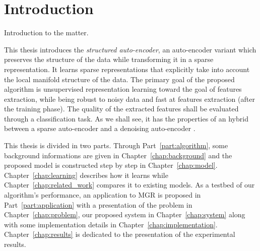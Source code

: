 \documentclass[a4paper,12pt,twoside]{report}
\newcommand{\partref}[1]{Part~\ref{part:#1}}
\newcommand{\chapref}[1]{Chapter~\ref{chap:#1}}
\begin{document}
\printglossaries




\chapter*{Introduction}

{\color{red} Introduction to the matter.}


This thesis introduces the \textit{structured auto-encoder}, an auto-encoder variant which preserves the structure of the data while transforming it in a sparse representation. It learns sparse representations that explicitly take into account the local manifold structure of the data.
The primary goal of the proposed algorithm is unsupervised representation learning toward the goal of features extraction, while being robust to noisy data and fast at features extraction (after the training phase). The quality of the extracted features shall be evaluated through a classification task.
As we shall see, it has the properties of an hybrid between a sparse auto-encoder \cite{lecun2006sparseAutoencoders, ranzato2007stackedSparseAutoencoders} and a denoising auto-encoder \cite{bengio2008denoisingAutoencoders}.

This thesis is divided in two parts. Through \partref{algorithm},
some background informations are given in \chapref{background} and the proposed model is
constructed step by step in \chapref{model}. \chapref{learning} describes how it learns while \chapref{related_work} compares it to existing models. As a testbed of our algorithm's performance, an application to \gls{MGR} is proposed in \partref{application} with a presentation of the problem in \chapref{problem}, our proposed system in \chapref{system} along with some implementation details in \chapref{implementation}. \chapref{results} is dedicated to the presentation of the experimental results.
\end{document}
